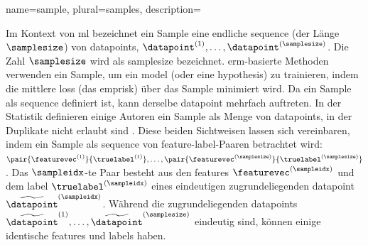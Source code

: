 {{{{
{
    name={sample},
    plural={samples},
    description={Im Kontext von \gls{ml} bezeichnet ein  Sample eine endliche \gls{sequence} 
        (der Länge $\samplesize$) von \glspl{datapoint}, $\datapoint^{(1)}, \ldots, \datapoint^{(\samplesize)}$. 
        Die Zahl $\samplesize$ wird als \gls{samplesize} bezeichnet. 
        \Gls{erm}-basierte Methoden verwenden ein Sample, um ein \gls{model} (oder eine \gls{hypothesis}) zu trainieren, 
        indem die mittlere \gls{loss} (das \gls{emprisk}) über das Sample minimiert wird. 
        Da ein Sample als \gls{sequence} definiert ist, kann derselbe \gls{datapoint} mehrfach auftreten. 
        In der Statistik definieren einige Autoren ein Sample als Menge von \glspl{datapoint}, 
        in der Duplikate nicht erlaubt sind \cite{Everitt2010,OxfordStatisticsDictionary}. 
        Diese beiden Sichtweisen lassen sich vereinbaren, indem ein Sample als \gls{sequence} von 
        \gls{feature}-\gls{label}-Paaren betrachtet wird:
        $\pair{\featurevec^{(1)}}{\truelabel^{(1)}}, \ldots, 
        \pair{\featurevec^{(\samplesize)}}{\truelabel^{(\samplesize)}}$. 
        Das $\sampleidx$-te Paar besteht aus den \glspl{feature} $\featurevec^{(\sampleidx)}$ 
        und dem \gls{label} $\truelabel^{(\sampleidx)}$ eines eindeutigen zugrundeliegenden 
        \gls{datapoint} $\widetilde{\datapoint}^{(\sampleidx)}$. Während die zugrundeliegenden 
        \glspl{datapoint} $\widetilde{\datapoint}^{(1)},\ldots,\widetilde{\datapoint}^{(\samplesize)}$ 
        eindeutig sind, können einige identische \glspl{feature} und \glspl{label} haben.
        \begin{figure} 
        \begin{center}
\end{center}
\end{figure}}}}}}}
